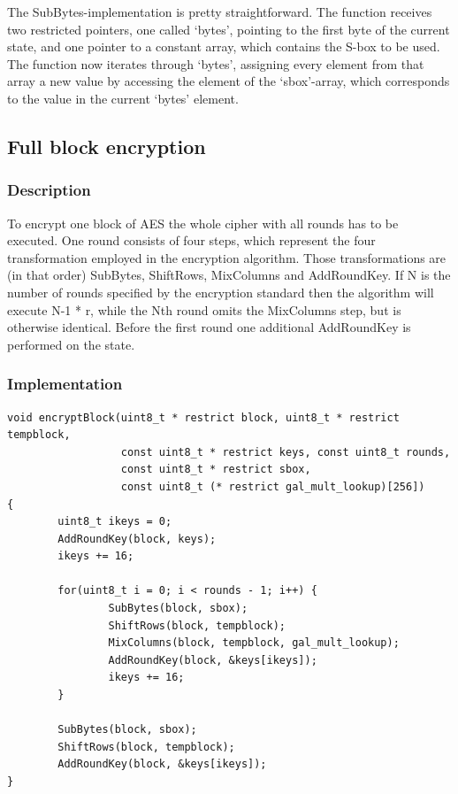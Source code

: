 The SubBytes-implementation is pretty straightforward. The function
receives two restricted pointers, one called `bytes', pointing to the
first byte of the current state, and one pointer to a constant array,
which contains the S-box to be used. The function now iterates through
`bytes', assigning every element from that array a new value by
accessing the element of the `sbox'-array, which corresponds to the
value in the current `bytes' element.

\hypertarget{full-block-encryption}{%
\subsection{Full block encryption}\label{full-block-encryption}}

\hypertarget{description-6}{%
\subsubsection{Description}\label{description-6}}

To encrypt one block of AES the whole cipher with all rounds has to be
executed. One round consists of four steps, which represent the four
transformation employed in the encryption algorithm. Those transformations are (in that order) SubBytes, ShiftRows, MixColumns and AddRoundKey.
If N is the number of rounds specified by the encryption standard then
the algorithm will execute N-1 * r, while the Nth round omits the
MixColumns step, but is otherwise identical. Before the first round one
additional AddRoundKey is performed on the state. \cite[ch. 5.1]{fips197}

\hypertarget{implementation-5}{%
\subsubsection{Implementation}\label{implementation-5}}

\begin{lstlisting}
void encryptBlock(uint8_t * restrict block, uint8_t * restrict tempblock, 
                  const uint8_t * restrict keys, const uint8_t rounds, 
                  const uint8_t * restrict sbox, 
                  const uint8_t (* restrict gal_mult_lookup)[256])
{   
        uint8_t ikeys = 0;
        AddRoundKey(block, keys);
        ikeys += 16;

        for(uint8_t i = 0; i < rounds - 1; i++) {   
                SubBytes(block, sbox);
                ShiftRows(block, tempblock);
                MixColumns(block, tempblock, gal_mult_lookup);
                AddRoundKey(block, &keys[ikeys]);
                ikeys += 16;
        }
        
        SubBytes(block, sbox);
        ShiftRows(block, tempblock);
        AddRoundKey(block, &keys[ikeys]);
}
\end{lstlisting}

